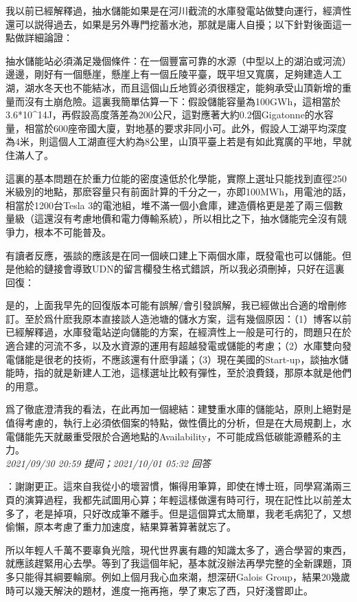\documentclass[twocolumn]{ctexart}
\begin{document}
我以前已經解釋過，抽水儲能如果是在河川截流的水庫發電站做雙向運行，經濟性還可以説得過去，如果是另外專門挖蓄水池，那就是庸人自擾；以下針對後面這一點做詳細論證：

抽水儲能站必須滿足幾個條件：在一個豐富可靠的水源（中型以上的湖泊或河流）邊邊，剛好有一個懸崖，懸崖上有一個丘陵平臺，既平坦又寬廣，足夠建造人工湖，湖水冬天也不能結冰，而且這個山丘地質必須很穩定，能夠承受山頂新增的重量而沒有土崩危險。這裏我簡單估算一下：假設儲能容量為100GWh，這相當於3.6*10\^{}14J，再假設高度落差為200公尺，這對應著大約0.2個Gigatonne的水容量，相當於600座帝國大廈，對地基的要求非同小可。此外，假設人工湖平均深度為4米，則這個人工湖直徑大約為8公里，山頂平臺上若是有如此寬廣的平地，早就住滿人了。

這裏的基本問題在於重力位能的密度遠低於化學能，實際上選址只能找到直徑250米級別的地點，那麽容量只有前面計算的千分之一，亦即100MWh，用電池的話，相當於1200台Tesla 3的電池組，堆不滿一個小倉庫，建造價格更是差了兩三個數量級（這還沒有考慮地價和電力傳輸系統），所以相比之下，抽水儲能完全沒有競爭力，根本不可能普及。


有讀者反應，張談的應該是在同一個峽口建上下兩個水庫，既發電也可以儲能。但是他給的鏈接會導致UDN的留言欄發生格式錯誤，所以我必須刪掉，只好在這裏回復：

是的，上面我早先的回復版本可能有誤解/會引發誤解，我已經做出合適的增刪修訂。至於爲什麽我原本直接談人造池塘的儲水方案，這有幾個原因：（1）博客以前已經解釋過，水庫發電站逆向儲能的方案，在經濟性上一般是可行的，問題只在於適合建的河流不多，以及水資源的運用有超越發電或儲能的考慮；（2）水庫雙向發電儲能是很老的技術，不應該還有什麽爭議；（3）現在美國的Start-up，談抽水儲能時，指的就是新建人工池，這樣選址比較有彈性，至於浪費錢，那原本就是他們的用意。


爲了徹底澄清我的看法，在此再加一個總結：建雙重水庫的儲能站，原則上絕對是值得考慮的，執行上必須依個案的特點，做性價比的分析，但是在大局規劃上，水電儲能先天就嚴重受限於合適地點的Availability，不可能成爲低碳能源體系的主力。
\\

\textit{\hfill\noindent\small 2021/09/30 20:59 提问；2021/10/01 05:32 回答}

：謝謝更正。這來自我從小的壞習慣，懶得用筆算，即使在博士班，同學寫滿兩三頁的演算過程，我都先試圖用心算；年輕這樣做還有時可行，現在記性比以前差太多了，老是掉項，只好改成筆不離手。但是這個算式太簡單，我老毛病犯了，又想偷懶，原本考慮了重力加速度，結果算著算著就忘了。

所以年輕人千萬不要辜負光陰，現代世界裏有趣的知識太多了，適合學習的東西，就應該趕緊用心去學。等到了我這個年紀，基本就沒辦法再學完整的全新課題，頂多只能得其綱要輪廓。例如上個月我心血來潮，想深研Galois Group，結果20幾歲時可以幾天解決的題材，進度一拖再拖，學了東忘了西，只好淺嘗即止。
\\
\end{document}
